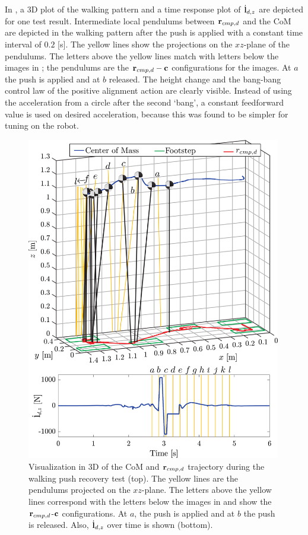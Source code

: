 In , a \ac{3D} plot of the walking pattern and a time response plot of $\dot{\mathbf{l}}_{d,z}$ are depicted for one test result. Intermediate local pendulums between $\mathbf{r}_{cmp,d}$ and the \ac{CoM} are depicted in the walking pattern after the push is applied with a constant time interval of $0.2$ [s]. The yellow lines show the projections on the $xz$-plane of the pendulums. The letters above the yellow lines match with letters below the images in ; the pendulums are the $\mathbf{r}_{cmp,d}-\mathbf{c}$ configurations for the images. At $a$ the push is applied and at $b$ released. The height change and the bang-bang control law of the positive alignment action are clearly visible. Instead of using the acceleration from a circle after the second `bang', a constant feedforward value is used on desired acceleration, because this was found to be simpler for tuning on the robot.
\begin{figure}
     \centering
        \includegraphics[width=0.99\textwidth]{STYLESTUFF/walk3D2.png}
        \caption{Visualization in \ac{3D} of the \ac{CoM} and $\mathbf{r}_{cmp,d}$ trajectory during the walking push recovery test (top). The yellow lines are the pendulums projected on the $xz$-plane. The letters above the yellow lines correspond with the letters below the images in  and show the $\mathbf{r}_{cmp,d}$-$\mathbf{c}$ configurations. At $a$, the push is applied and at $b$ the push is released. Also, $\dot{\mathbf{l}}_{d,z}$ over time is shown (bottom).}
        \label{fig:walk3D}
\end{figure}

